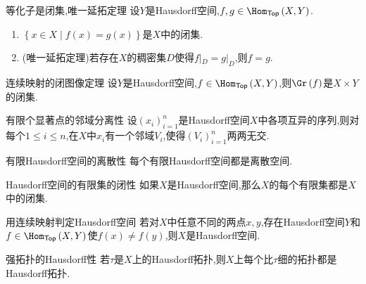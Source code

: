 \begin{proposition}{等化子是闭集,唯一延拓定理}{}
	设$Y$是Hausdorff空间,$f,g\in\Hom_{\mathsf{Top}}\left(X,Y\right)$.
	\begin{enumerate}
		\item $\left\{x\in X\middle|f\left(x\right)=g\left(x\right)\right\}$是$X$中的闭集.
		\item (唯一延拓定理)若存在$X$的稠密集$D$使得$f|_{D}=g|_{D}$,则$f=g$.
	\end{enumerate}
\end{proposition}

\begin{corollary}{连续映射的闭图像定理}{}
	设$Y$是Hausdorff空间,$f\in\Hom_{\mathsf{Top}}\left(X,Y\right)$,则$\Gr\left(f\right)$是$X\times Y$的闭集.
\end{corollary}

\begin{proposition}{有限个显著点的邻域分离性}{}
	设$\left(x_{i}\right)_{i=1}^{n}$是Hausdorff空间$X$中各项互异的序列,则对每个$1\leq i\leq n$,在$X$中$x_{i}$有一个邻域$V_{i}$,使得$\left(V_{i}\right)_{i=1}^{n}$两两无交.
\end{proposition}

\begin{corollary}{有限Hausdorff空间的离散性}{}
	每个有限Hausdorff空间都是离散空间.
\end{corollary}

\begin{proposition}{Hausdorff空间的有限集的闭性}{}
	如果$X$是Hausdorff空间,那么$X$的每个有限集都是$X$中的闭集.
\end{proposition}

\begin{proposition}{用连续映射判定Hausdorff空间}{}
	若对$X$中任意不同的两点$x,y$,存在Hausdorff空间$Y$和$f\in\Hom_{\mathsf{Top}}\left(X,Y\right)$使$f\left(x\right)\neq f\left(y\right)$,则$X$是Hausdorff空间.
\end{proposition}

\begin{corollary}{强拓扑的Hausdorff性}{}
	若$\tau$是$X$上的Hausdorff拓扑,则$X$上每个比$\tau$细的拓扑都是Hausdorff拓扑.
\end{corollary}